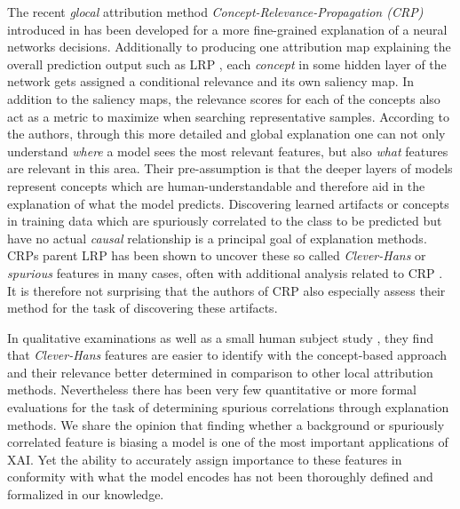 The recent \textit{glocal} attribution method \textit{Concept-Relevance-Propagation (CRP)} introduced in \cite{Achtibat2022} has been developed for a more fine-grained explanation of a neural networks decisions. Additionally to producing one attribution map explaining the overall prediction output such as LRP \cite{Bach2015}, each \textit{concept} in some hidden layer of the network gets assigned a conditional relevance and its own saliency map. In addition to the saliency maps, the relevance scores for each of the concepts also act as a metric to maximize when searching representative samples. According to the authors, through this more detailed and global explanation one can not only understand \textit{where} a model sees the most relevant features, but also \textit{what} features are relevant in this area. Their pre-assumption is that the deeper layers of models represent concepts which are human-understandable and therefore aid in the explanation of what the model predicts. Discovering learned artifacts or concepts in training data which are spuriously correlated to the class to be predicted but have no actual \textit{causal} relationship is a principal goal of explanation methods. CRPs parent LRP has been shown to uncover these so called \textit{Clever-Hans} or \textit{spurious} features in many cases, often with additional analysis related to CRP \cite{Lapuschkin2019, Anders2022}. It is therefore not surprising that the authors of CRP also especially assess their method for the task of discovering these artifacts. 

In qualitative examinations as well as a small human subject study \cite{Achtibat2023}, they find that \textit{Clever-Hans} features are easier to identify with the concept-based approach and their relevance better determined in comparison to other local attribution methods. Nevertheless there has been very few quantitative or more formal evaluations for the task of determining spurious correlations through explanation methods. 
We share the opinion that finding whether a background or spuriously correlated feature is biasing a model is one of the most important applications of XAI. Yet the ability to accurately assign importance to these features in conformity with what the model encodes has not been thoroughly defined and formalized in our knowledge. 

